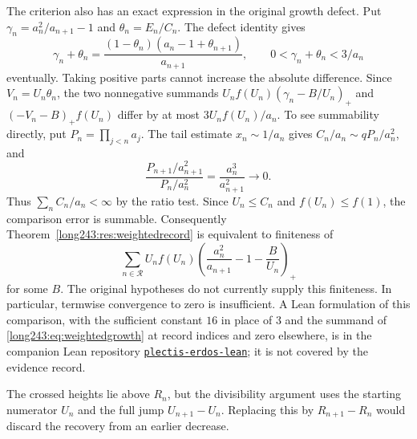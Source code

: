 \documentclass[11pt]{article}
\begin{document}
The criterion also has an exact expression in the original growth defect.
Put $\gamma_n=a_n^2/a_{n+1}-1$ and $\theta_n=E_n/C_n$. The defect identity
gives
\[
 \gamma_n+\theta_n=
 \frac{(1-\theta_n)(a_n-1+\theta_{n+1})}{a_{n+1}},
 \qquad 0<\gamma_n+\theta_n<3/a_n
\]
eventually. Taking positive parts cannot increase the absolute difference.
Since $V_n=U_n\theta_n$, the two nonnegative summands
$U_nf(U_n)(\gamma_n-B/U_n)_+$ and $(-V_n-B)_+f(U_n)$ differ by at most
$3U_nf(U_n)/a_n$. To see summability directly, put $P_n=\prod_{j<n}a_j$.
The tail estimate $x_n\sim1/a_n$ gives $C_n/a_n\sim qP_n/a_n^2$, and
\[
 \frac{P_{n+1}/a_{n+1}^{2}}{P_n/a_n^{2}}
 =\frac{a_n^3}{a_{n+1}^{2}}\longrightarrow0.
\]
Thus $\sum_n C_n/a_n<\infty$ by the ratio test. Since $U_n\le C_n$ and
$f(U_n)\le f(1)$, the comparison error is summable.
Consequently Theorem~\ref{long243:res:weightedrecord} is equivalent to finiteness of
\begin{equation}\label{long243:eq:weightedgrowth}
 \sum_{n\in\mathcal R}U_nf(U_n)
 \left(\frac{a_n^2}{a_{n+1}}-1-\frac B{U_n}\right)_+
\end{equation}
for some $B$. The original hypotheses do not currently supply this
finiteness. In particular, termwise convergence to zero is insufficient.
A Lean formulation of this comparison, with the sufficient constant $16$
in place of $3$ and the summand of \eqref{long243:eq:weightedgrowth} at
record indices and zero elsewhere, is in the companion Lean repository
\href{https://github.com/wcook04/plectis-erdos-lean/blob/52f29ad173b04e3bac941b3663f2b9aebe5de0bb/ErdosProblems/Erdos243/PaperCompleteR8/GrowthDebtSummability.lean\#L234}{\texttt{plectis-erdos-lean}};
it is not covered by the evidence record.

The crossed heights lie above $R_n$, but the divisibility argument uses
the starting numerator $U_n$ and the full jump $U_{n+1}-U_n$. Replacing
this by $R_{n+1}-R_n$ would discard the recovery from an earlier decrease.
\end{document}

